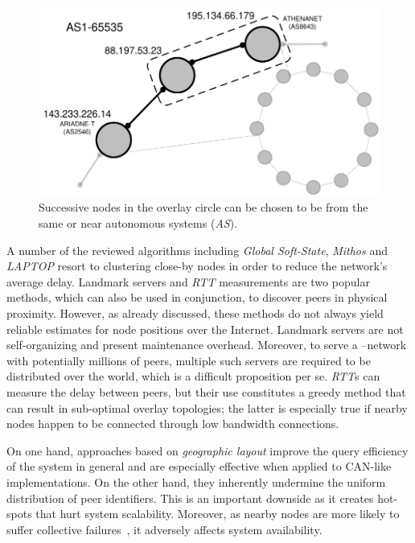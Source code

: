 \begin{figure}[ht]
\centering
  \includegraphics[scale=0.36]{img/pdf/geographic-layout.pdf}
\caption{Successive nodes in the overlay circle can be chosen to be from the
same or near autonomous systems (\emph{AS}).}
\label{figure:geographic-layout}
\end{figure}
A number of the reviewed algorithms including 
\emph{Global Soft-State},
\emph{Mithos} and \emph{LAPTOP} resort to clustering close-by nodes in
order to reduce the network's average delay.
Landmark servers and \emph{RTT} measurements are two popular methods, which
can also be used in conjunction, to discover peers in physical proximity.
However, as already discussed, these
methods do not always yield reliable estimates for node positions over the
Internet. 
Landmark servers are not self-organizing and present maintenance
overhead. Moreover, to serve a \p--network with potentially millions of peers, multiple
such servers are required to be distributed over the world, which is a difficult
proposition per se.
\emph{RTT}s can measure the delay between peers, but their use constitutes a
greedy method that can result in sub-optimal overlay topologies;
the latter is especially true if nearby 
nodes happen to be connected through low bandwidth connections.

On one hand, approaches based on \emph{geographic layout} improve the query
efficiency of the system in general and are especially effective when applied
to CAN-like implementations. On the other hand, they inherently undermine the
uniform distribution of peer identifiers. This is an important downside as it
creates hot-spots that hurt system scalability. Moreover, as nearby nodes
are more likely to suffer collective failures~\cite{HY2007}, it adversely affects
system availability.

